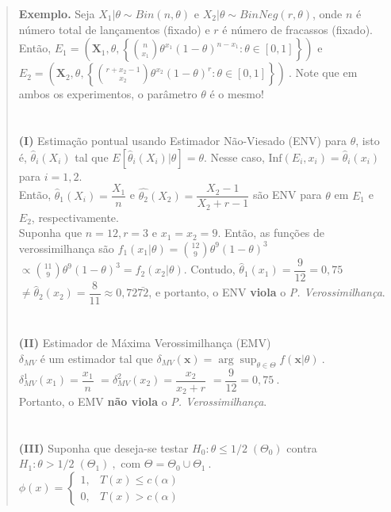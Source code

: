 \documentclass[
]{book}
\begin{document}
\begin{quote}
\textbf{Exemplo.} Seja \(X_1|\theta \sim Bin(n,\theta)\) e \(X_2|\theta \sim BinNeg(r,\theta)\), onde \(n\) é número total de lançamentos (fixado) e \(r\) é número de fracassos (fixado). Então, \(E_1=\left(\boldsymbol X_1,\theta,\left\{\binom{n}{x_1}\theta^{x_1}(1-\theta)^{n-x_1}:\theta\in[0,1]\right\}\right)\) e \(E_2=\left(\boldsymbol X_2,\theta,\left\{\binom{r+x_2-1}{x_2}\theta^{x_2}(1-\theta)^{r}:\theta\in[0,1]\right\}\right)~.\) Note que em ambos os experimentos, o parâmetro \(\theta\) é o mesmo!\\
\(~\)\\
\(~\)\\
\textbf{(I)} Estimação pontual usando Estimador Não-Viesado (ENV) para \(\theta\), isto é, \(\hat{\theta}_i(X_i)\) tal que \(E\left[\hat{\theta}_i(X_i)|\theta\right]=\theta\). Nesse caso, \(\text{Inf}(E_i,x_i)=\hat{\theta}_i(x_i)\) para \(i=1,2\).\\
Então, \(\hat{\theta}_1(X_i)=\dfrac{X_1}{n}\) e \(\hat{\theta_2}(X_2)=\dfrac{X_2-1}{X_2+r-1}\) são ENV para \(\theta\) em \(E_1\) e \(E_2\), respectivamente.\\
Suponha que \(n=12,r=3\) e \(x_1=x_2=9\). Então, as funções de verossimilhança são \(f_1(x_1|\theta)=\binom{12}{9}\theta^9(1-\theta)^3\) \(\propto \binom{11}{9}\theta^9(1-\theta)^3=f_2(x_2|\theta)\). Contudo, \(\hat{\theta}_1(x_1)=\dfrac{9}{12}=0,75\) \(\neq\hat{\theta}_2(x_2)=\dfrac{8}{11}\approx0,72\bar{72}\), e portanto, o ENV \textbf{viola} o \emph{P. Verossimilhança}.\\
\(~\)\\
\(~\)\\
\textbf{(II)} Estimador de Máxima Verossimilhança (EMV)\\
\(\delta_{MV}\) é um estimador tal que \(\delta_{MV}(\boldsymbol x)=\displaystyle\arg\sup_{\theta\in\Theta} f(\boldsymbol x|\theta)~.\)\\
\(\delta_{MV}^1(x_1)=\dfrac{x_1}{n}\) \(=\delta^2_{MV}(x_2)=\dfrac{x_2}{x_2+r}\) \(=\dfrac{9}{12}=0,75~.\)\\
Portanto, o EMV \textbf{não viola} o \emph{P. Verossimilhança}.\\
\(~\)\\
\(~\)\\
\textbf{(III)} Suponha que deseja-se testar \(H_0:\theta\leq 1/2 \; (\Theta_0)\) contra \(H_1:\theta > 1/2 \; (\Theta_1)~,\) com \(\Theta=\Theta_0 \cup \Theta_1~.\)\\
\(\phi(x)=\left\{\begin{array}{ll} 1,& T(x)\leq c(\alpha)\\ 0,& T(x)> c(\alpha)\end{array}\right.\)\\

\end{quote}
\end{document}
